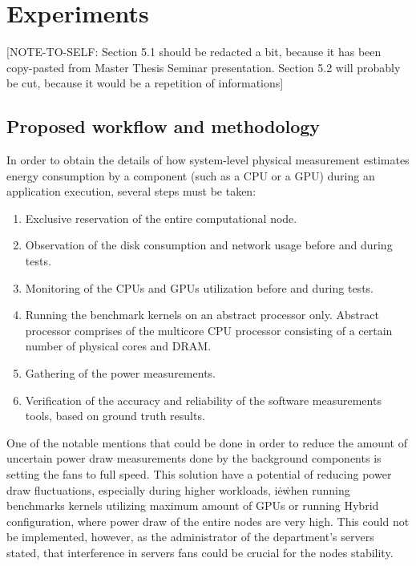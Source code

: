 \chapter{Experiments}


[NOTE-TO-SELF: Section 5.1 should be redacted a bit, because it has been 
copy-pasted from Master Thesis Seminar presentation. Section 5.2 will
probably be cut, because it would be a repetition of informations]

\section{Proposed workflow and methodology}

In order to obtain the details of how system-level physical measurement
estimates energy consumption by a component (such as a CPU or a GPU)
during an application execution, several steps must be taken:

\begin{enumerate}
    \item Exclusive reservation of the entire computational node.
    \item Observation of the disk consumption and network usage before and
    during tests.
    \item Monitoring of the CPUs and GPUs utilization before and during tests.
    \item Running the benchmark kernels on an abstract processor only.
    Abstract processor comprises of the multicore CPU processor consisting
    of a certain number of physical cores and DRAM\@.
    \item Gathering of the power measurements.
    \item Verification of the accuracy and reliability of the software
    measurements tools, based on ground truth results.
\end{enumerate}

One of the notable mentions that could be done in order to reduce the amount
of uncertain power draw measurements done by the background components is
setting the fans to full speed. This solution have a potential of reducing
power draw fluctuations, especially during higher workloads, i\. e\. when
running benchmarks kernels utilizing maximum amount of GPUs or running Hybrid
configuration, where power draw of the entire nodes are very high. This could
not be implemented, however, as the administrator of the department's servers
stated, that interference in servers fans could be crucial for the nodes
stability.

